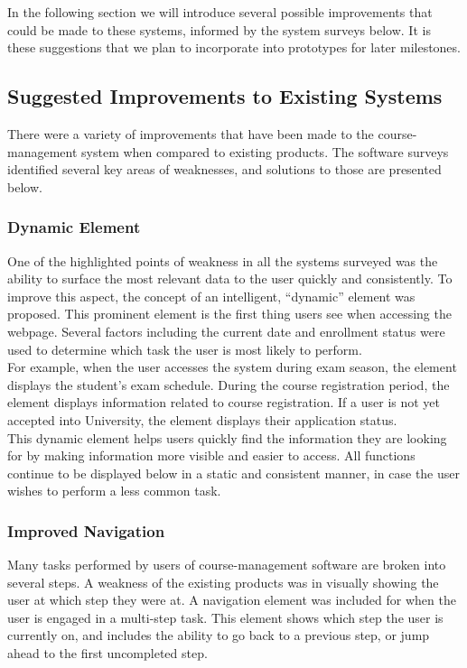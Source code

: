 \documentclass[10pt]{article}
\begin{document}
\begin{multicols}{2}
In the following section we will introduce several possible improvements that 
could be made to these systems, informed by the system surveys below. It is 
these suggestions that we plan to incorporate into prototypes for later 
milestones.

\subsection*{Suggested Improvements to Existing Systems}
There were a variety of improvements that have been made to the course-management 
system when compared to existing products. The software surveys identified 
several key areas of weaknesses, and solutions to those are presented below.

\subsubsection*{Dynamic Element}
One of the highlighted points of weakness in all the systems surveyed was the 
ability to surface the most relevant data to the user quickly and consistently. 
To improve this aspect, the concept of an intelligent, ``dynamic'' element was 
proposed. This prominent element is the first thing users see when 
accessing the webpage. Several factors including the current date and enrollment 
status were used to determine which task the user is most likely to perform.
\\

For example, when the user accesses the system during exam season, the element 
 displays the student's exam schedule. During the course registration period, 
the element displays information related to course registration. If a user 
is not yet accepted into University, the element displays their application 
status.\\

This dynamic element helps users quickly find the information they are 
looking for by making information more visible and easier to access. All functions continue to be 
displayed below in a static and consistent manner, in case the user wishes to perform a less common task.

\subsubsection*{Improved Navigation}
Many tasks performed by users of course-management software are broken into 
several steps. A weakness of the existing products was in visually showing the 
user at which step they were at. A navigation element was included for when the user is engaged in a multi-step task.
This element shows which step the user is currently on, and includes the ability to 
go back to a previous step, or jump ahead to the first uncompleted step.\\


\end{multicols}
\end{document}
